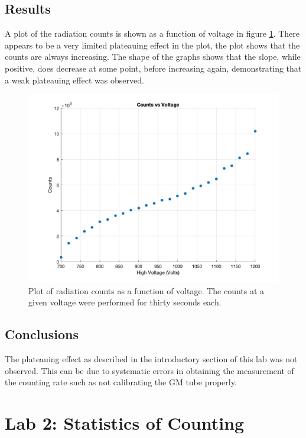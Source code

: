\documentclass[reprint,amsmath,amssymb,aps,prl]{revtex4-2}
\begin{document}
\subsection{Results}
A plot of the radiation counts is shown as a function of voltage in figure \ref{fig:gm_plateau}. There appears to be a very limited plateauing effect in the plot, the plot shows that the counts are always increasing. The shape of the graphs shows that the slope, while positive, does decrease at some point, before increasing again, demonstrating that a weak plateauing effect was observed. 
\begin{figure}
    \centering
    \includegraphics[width = \columnwidth]{GMPlateau.jpg}
    \caption{Plot of radiation counts as a function of voltage. The counts at a given voltage were performed for thirty seconds each.}
    \label{fig:gm_plateau}
\end{figure}
\subsection{Conclusions}
The plateauing effect as described in the introductory section of this lab was not observed. This can be due to systematic errors in obtaining the measurement of the counting rate such as not calibrating the GM tube properly. 

\section{Lab 2: Statistics of Counting }
\end{document}
